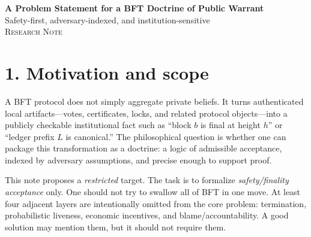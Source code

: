 \documentclass[11pt]{article}
\begin{document}
\begin{center}
    {\LARGE \textbf{A Problem Statement for a BFT Doctrine of Public Warrant}}\\[0.5em]
    {\large Safety-first, adversary-indexed, and institution-sensitive}\\[0.8em]
    \textsc{Research Note}
\end{center}

\begin{abstract}
This note formulates a restricted but nontrivial problem: construct a categorical or doctrine-like semantics for Byzantine fault tolerant (BFT) finality that treats finalized claims as \emph{institutionally warranted} rather than merely believed. The target is not a full theory of distributed systems. It is a safety-only account of when a protocol-valid authenticated evidence pattern licenses acceptance of a claim as publicly stable under an explicit adversary model. We isolate the output object, specify admissibility and adequacy conditions, and record a small number of solution hints. The scope is deliberately narrow: liveness, scheduling, randomization, incentives, and accountability are left outside the core problem, except as extension directions.
\end{abstract}

\section*{1. Motivation and scope}
A BFT protocol does not simply aggregate private beliefs. It turns authenticated local artifacts---votes, certificates, locks, and related protocol objects---into a publicly checkable institutional fact such as ``block $b$ is final at height $h$'' or ``ledger prefix $L$ is canonical.'' The philosophical question is whether one can package this transformation as a doctrine: a logic of admissible acceptance, indexed by adversary assumptions, and precise enough to support proof.

This note proposes a \emph{restricted} target. The task is to formalize \emph{safety/finality acceptance} only. One should not try to swallow all of BFT in one move. At least four adjacent layers are intentionally omitted from the core problem: termination, probabilistic liveness, economic incentives, and blame/accountability. A good solution may mention them, but it should not require them.
\end{document}
